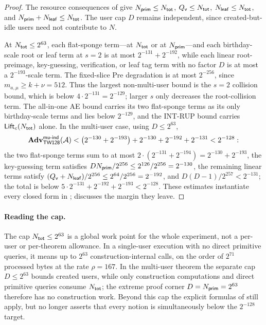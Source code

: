 \begin{proof}
The resource consequences of  give
$N_{\mathsf{prim}} \leq N_{\mathsf{tot}}$, $Q_{\mathsf{v}} \leq N_{\mathsf{tot}}$, $N_{\mathsf{leaf}} \leq N_{\mathsf{tot}}$, and
$N_{\mathsf{prim}}+N_{\mathsf{leaf}} \leq N_{\mathsf{tot}}$. The user cap $D$ remains independent, since
created-but-idle users need not contribute to $N$.

At $N_{\mathsf{tot}} \leq 2^{63}$, each flat-sponge term---at $N_{\mathsf{tot}}$ or at
$N_{\mathsf{prim}}$---and each birthday-scale root or leaf term at $s=2$ is at most
$2^{-131} + 2^{-192}$, while each
linear root-preimage, key-guessing, verification, or leaf tag term with no
factor $D$ is at most a $2^{-193}$-scale term.
The fixed-slice Pre degradation is at most $2^{-256}$, since
$m_{a,\mu} \geq k+\nu = 512$.
Thus the largest non-multi-user bound is the $s=2$ collision bound, which is
below $4 \cdot 2^{-131} = 2^{-129}$; larger $s$ only decreases the
root-collision term. The all-in-one AE bound carries its two flat-sponge
terms as its only birthday-scale terms and lies below $2^{-129}$, and the
\textsf{INT-RUP} bound carries $\mathsf{Lift}_c(N_{\mathsf{tot}})$ alone. In the multi-user
case, using $D \leq 2^{63}$,
\[
  \mathbf{Adv}^{\mathsf{mu\text{-}ind}}_{\textsf{TW128}}(\mathcal{A})
  < \bigl(2^{-130} + 2^{-193}\bigr) + 2^{-130} + 2^{-192} + 2^{-131}
  < 2^{-128}:
\]
the two flat-sponge terms sum to at most
$2 \cdot (2^{-131} + 2^{-194}) = 2^{-130} + 2^{-193}$, the key-guessing
term satisfies $D N_{\mathsf{prim}} / 2^{256} \leq 2^{126}/2^{256} = 2^{-130}$, the
remaining linear terms satisfy
$(Q_{\mathsf{v}} + N_{\mathsf{leaf}})/2^{256} \leq 2^{64}/2^{256} = 2^{-192}$, and
$D(D-1)/2^{257} < 2^{-131}$; the total is below
$5 \cdot 2^{-131} + 2^{-192} + 2^{-193} < 2^{-128}$. These estimates
instantiate every closed form in ;
 discusses the margin they leave.
\end{proof}

\paragraph{Reading the cap.}
The cap $N_{\mathsf{tot}} \leq 2^{63}$ is a global work point for the whole experiment,
not a per-user or per-theorem allowance. In a single-user execution with no
direct primitive queries, it means up to $2^{63}$ construction-internal
\Keccakp{} calls, on the order of $2^{71}$ processed bytes at the rate
$\rho=167$. In the multi-user theorem the separate cap $D \leq 2^{63}$ bounds
created users, while only construction computations and direct primitive
queries consume $N_{\mathsf{tot}}$; the extreme proof corner $D=N_{\mathsf{prim}}=2^{63}$ therefore
has no construction work. Beyond this cap the explicit formulas of
 still apply, but  no longer
asserts that every notion is simultaneously below the $2^{-128}$ target.

